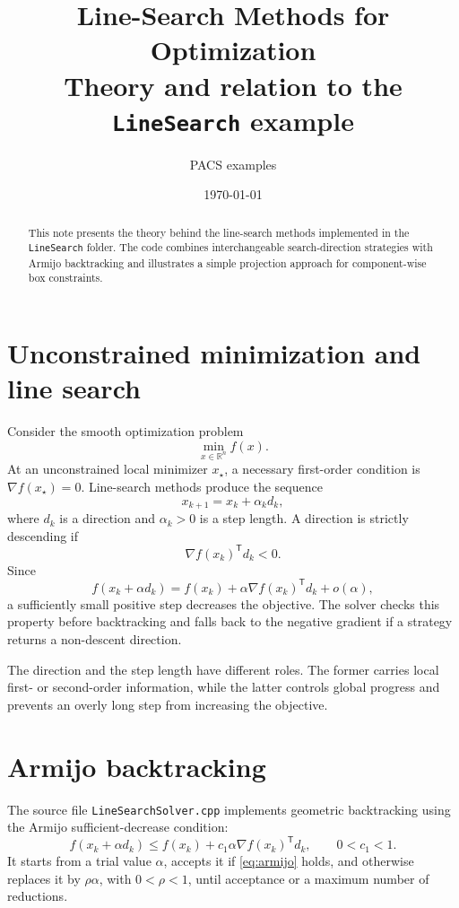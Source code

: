 \documentclass[11pt,a4paper]{article}
\title{Line-Search Methods for Optimization\\
\large Theory and relation to the \texttt{LineSearch} example}
\author{PACS examples}
\date{\today}
\newcommand{\R}{\mathbb{R}}
\newcommand{\grad}{\nabla}
\newcommand{\trans}{\mathsf{T}}
\begin{document}
\maketitle

\begin{abstract}
This note presents the theory behind the line-search methods implemented in the
\texttt{LineSearch} folder. The code combines interchangeable search-direction
strategies with Armijo backtracking and illustrates a simple projection approach
for component-wise box constraints.
\end{abstract}

\section{Unconstrained minimization and line search}

Consider the smooth optimization problem
\begin{equation}
  \min_{x\in\R^n} f(x).
  \label{eq:problem}
\end{equation}
At an unconstrained local minimizer $x_\star$, a necessary first-order
condition is $\grad f(x_\star)=0$. Line-search methods produce the sequence
\begin{equation}
  x_{k+1}=x_k+\alpha_kd_k,
  \label{eq:update}
\end{equation}
where $d_k$ is a direction and $\alpha_k>0$ is a step length. A direction is
strictly descending if
\begin{equation}
  \grad f(x_k)^\trans d_k<0.
  \label{eq:descent}
\end{equation}
Since
\[
  f(x_k+\alpha d_k)=f(x_k)+\alpha\grad f(x_k)^\trans d_k+o(\alpha),
\]
a sufficiently small positive step decreases the objective. The solver checks
this property before backtracking and falls back to the negative gradient if a
strategy returns a non-descent direction.

The direction and the step length have different roles. The former carries
local first- or second-order information, while the latter controls global
progress and prevents an overly long step from increasing the objective.

\section{Armijo backtracking}

The source file \texttt{LineSearchSolver.cpp} implements geometric
backtracking using the Armijo sufficient-decrease condition:
\begin{equation}
 f(x_k+\alpha d_k)\leq f(x_k)+c_1\alpha\grad f(x_k)^\trans d_k,
 \qquad 0<c_1<1.
 \label{eq:armijo}
\end{equation}
It starts from a trial value $\alpha$, accepts it if \eqref{eq:armijo} holds,
and otherwise replaces it by $\rho\alpha$, with $0<\rho<1$, until acceptance or
a maximum number of reductions.
\end{document}
